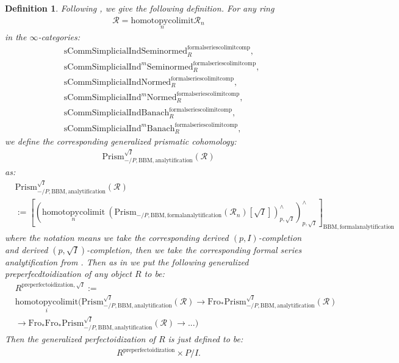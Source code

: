 \documentclass[12pt]{book}
\newtheorem{definition}{Definition}
\begin{document}
\begin{definition}
Following \cite{BS}, we give the following definition. For any ring
\begin{align}
\mathcal{R}=\underset{n}{\mathrm{homotopycolimit}}\mathcal{R}_n	
\end{align}
in the $\infty$-categories:
\begin{align}
&\mathrm{sComm}\mathrm{Simplicial}\mathrm{Ind}\mathrm{Seminormed}^\mathrm{formalseriescolimitcomp}_R,\\
&\mathrm{sComm}\mathrm{Simplicial}\mathrm{Ind}^m\mathrm{Seminormed}^\mathrm{formalseriescolimitcomp}_R,\\
&\mathrm{sComm}\mathrm{Simplicial}\mathrm{Ind}\mathrm{Normed}^\mathrm{formalseriescolimitcomp}_R,\\
&\mathrm{sComm}\mathrm{Simplicial}\mathrm{Ind}^m\mathrm{Normed}^\mathrm{formalseriescolimitcomp}_R,\\
&\mathrm{sComm}\mathrm{Simplicial}\mathrm{Ind}\mathrm{Banach}^\mathrm{formalseriescolimitcomp}_R,\\
&\mathrm{sComm}\mathrm{Simplicial}\mathrm{Ind}^m\mathrm{Banach}^\mathrm{formalseriescolimitcomp}_R,	
\end{align}	
we define the corresponding generalized prismatic cohomology:
\begin{align}
\mathrm{Prism}^{\sqrt{I}}_{-/P,\mathrm{BBM},\mathrm{analytification}}(\mathcal{R})
\end{align}
as:
\begin{align}
&\mathrm{Prism}^{\sqrt{I}}_{-/P,\mathrm{BBM},\mathrm{analytification}}(\mathcal{R})\\
&:=\left[\left(\underset{n}{\mathrm{homotopycolimit}}~ (\mathrm{Prism}_{-/P,\mathrm{BBM},\mathrm{formalanalytification}}(\mathcal{R}_n)[\sqrt{I}])^\wedge_{p,\sqrt{I}}\right)^\wedge_{p,\sqrt{I}}\right]_{\mathrm{BBM},\mathrm{formalanalytification}}	
\end{align}
where the notation means we take the corresponding derived $(p,I)$-completion and derived $(p,\sqrt{I})$-completion, then we take the corresponding formal series analytification from \cite[4.2]{BBM}. Then as in \cite[Definition 8.2]{BS} we put the following generalized  preperfecdtoidization of any object $R$ to be:
\begin{align}
&R^{\mathrm{preperfectoidization},\sqrt{I}}:=\\
&\underset{i}{\mathrm{homotopycolimit}}(\mathrm{Prism}^{\sqrt{I}}_{-/P,\mathrm{BBM},\mathrm{analytification}}(\mathcal{R})\rightarrow \mathrm{Fro}_*\mathrm{Prism}^{\sqrt{I}}_{-/P,\mathrm{BBM},\mathrm{analytification}}(\mathcal{R})\\
&\rightarrow \mathrm{Fro}_*\mathrm{Fro}_*\mathrm{Prism}^{\sqrt{I}}_{-/P,\mathrm{BBM},\mathrm{analytification}}(\mathcal{R})\rightarrow...)	
\end{align}
Then the generalized perfectoidization of $R$ is just defined to be:
\begin{align}
R^\mathrm{preperfectoidization}\times P/I.	
\end{align}

\end{definition}
\end{document}

